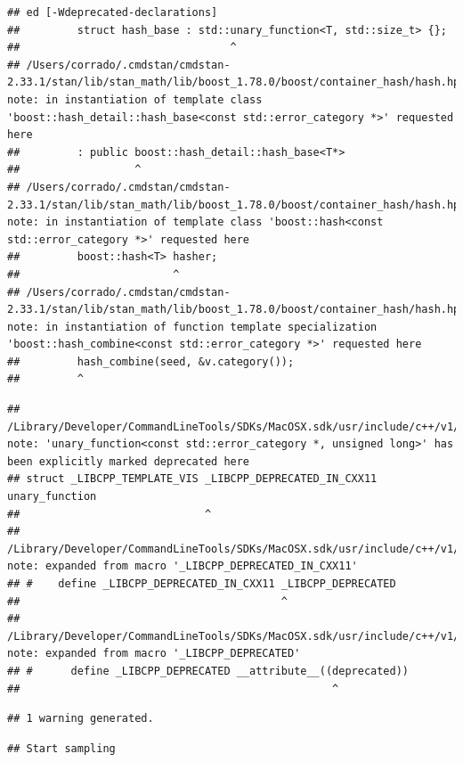 \documentclass[
]{article}
\begin{document}
\begin{verbatim}
## ed [-Wdeprecated-declarations]
##         struct hash_base : std::unary_function<T, std::size_t> {};
##                                 ^
## /Users/corrado/.cmdstan/cmdstan-2.33.1/stan/lib/stan_math/lib/boost_1.78.0/boost/container_hash/hash.hpp:692:18: note: in instantiation of template class 'boost::hash_detail::hash_base<const std::error_category *>' requested here
##         : public boost::hash_detail::hash_base<T*>
##                  ^
## /Users/corrado/.cmdstan/cmdstan-2.33.1/stan/lib/stan_math/lib/boost_1.78.0/boost/container_hash/hash.hpp:420:24: note: in instantiation of template class 'boost::hash<const std::error_category *>' requested here
##         boost::hash<T> hasher;
##                        ^
## /Users/corrado/.cmdstan/cmdstan-2.33.1/stan/lib/stan_math/lib/boost_1.78.0/boost/container_hash/hash.hpp:551:9: note: in instantiation of function template specialization 'boost::hash_combine<const std::error_category *>' requested here
##         hash_combine(seed, &v.category());
##         ^
\end{verbatim}

\begin{verbatim}
## /Library/Developer/CommandLineTools/SDKs/MacOSX.sdk/usr/include/c++/v1/__functional/unary_function.h:23:29: note: 'unary_function<const std::error_category *, unsigned long>' has been explicitly marked deprecated here
## struct _LIBCPP_TEMPLATE_VIS _LIBCPP_DEPRECATED_IN_CXX11 unary_function
##                             ^
## /Library/Developer/CommandLineTools/SDKs/MacOSX.sdk/usr/include/c++/v1/__config:825:41: note: expanded from macro '_LIBCPP_DEPRECATED_IN_CXX11'
## #    define _LIBCPP_DEPRECATED_IN_CXX11 _LIBCPP_DEPRECATED
##                                         ^
## /Library/Developer/CommandLineTools/SDKs/MacOSX.sdk/usr/include/c++/v1/__config:810:49: note: expanded from macro '_LIBCPP_DEPRECATED'
## #      define _LIBCPP_DEPRECATED __attribute__((deprecated))
##                                                 ^
\end{verbatim}

\begin{verbatim}
## 1 warning generated.
\end{verbatim}

\begin{verbatim}
## Start sampling
\end{verbatim}
\end{document}
